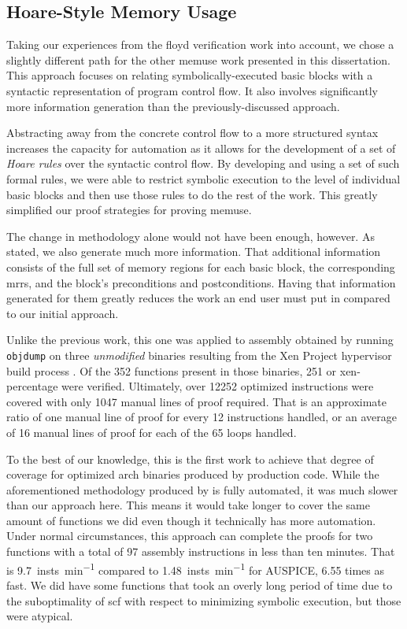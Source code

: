 \subsection{Hoare-Style Memory Usage}
Taking our experiences from the \gls{floyd} verification work into account, we chose a slightly different path for the other \gls{memuse} work presented in this dissertation.
This approach focuses on relating symbolically-executed basic blocks with a syntactic representation of program control flow.
It also involves significantly more information generation than the previously-discussed approach.

Abstracting away from the concrete control flow to a more structured syntax increases the capacity for automation as it allows for the development of a set of \emph{Hoare rules} \autocite{hoare1969axiomatic} over the syntactic control flow.
By developing and using a set of such formal rules, we were able to restrict symbolic execution to the level of individual basic blocks and then use those rules to do the rest of the work.
This greatly simplified our proof strategies for proving \gls{memuse}.

The change in methodology alone would not have been enough, however.
As stated, we also generate much more information.
That additional information consists of the full set of memory regions for each basic block, the corresponding \glspl{mrr}, and the block's preconditions and postconditions.
Having that information generated for them greatly reduces the work an end user must put in compared to our initial approach.

Unlike the previous work, this one was applied to assembly obtained by running \texttt{objdump} on three \emph{unmodified} binaries resulting from the Xen Project hypervisor build process \autocite{chisnall2008definitive}.
Of the \num{352} functions present in those binaries, \num{251} or \gls{xen-percentage} were verified.
Ultimately, over \num{12252} optimized instructions were covered with only \num{1047} manual lines of proof required.
That is an approximate ratio of one manual line of proof for every \num{12} instructions handled, or an average of \num{16} manual lines of proof for each of the \num{65} loops handled.

To the best of our knowledge, this is the first work to achieve that degree of coverage for optimized \gls{arch} binaries produced by production code.
While the aforementioned methodology produced by \textcite{tan2015auspice} is fully automated, it was much slower than our approach here.
This means it would take longer to cover the same amount of functions we did even though it technically has more automation.
Under normal circumstances, this approach can complete the proofs for two functions with a total of \num{97} assembly instructions in less than ten minutes.
That is \SI{9.7}{insts\per\minute} compared to \SI{1.48}{insts\per\minute} for AUSPICE, \num{6.55} times as fast.
We did have some functions that took an overly long period of time due to the suboptimality of \gls{scf} with respect to minimizing symbolic execution, but those were atypical.

